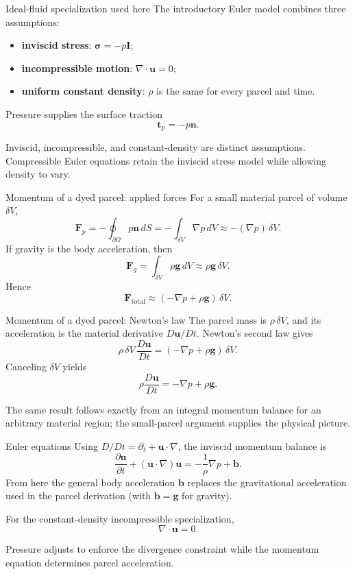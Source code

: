 \documentclass[aspectratio=169,11pt]{beamer}
\newcommand{\uvec}{\bm{u}}
\newcommand{\nvec}{\bm{n}}
\newcommand{\bvec}{\bm{b}}
\newcommand{\tvec}{\bm{t}}
\newcommand{\stress}{\bm{\sigma}}
\newcommand{\Identity}{\mathbf{I}}
\begin{document}
\begin{frame}{Ideal-fluid specialization used here}
The introductory Euler model combines three assumptions:
\begin{itemize}\itemsep7pt
  \item \textbf{inviscid stress}: $\stress=-p\Identity$;
  \item \textbf{incompressible motion}: $\nabla\cdot\uvec=0$;
  \item \textbf{uniform constant density}: $\rho$ is the same for every parcel and time.
\end{itemize}
Pressure supplies the surface traction
\[
  \tvec_p=-p\nvec.
\]
\begin{punchbox}
\small Inviscid, incompressible, and constant-density are distinct assumptions. Compressible Euler equations retain the inviscid stress model while allowing density to vary.
\end{punchbox}
\end{frame}

\begin{frame}{Momentum of a dyed parcel: applied forces}
For a small material parcel of volume $\delta V$,
\[
  \mathbf{F}_p
  =-\oint_{\partial\Omega}p\nvec\,dS
  =-\int_{\delta V}\nabla p\,dV
  \approx-(\nabla p)\,\delta V.
\]
If gravity is the body acceleration, then
\[
  \mathbf{F}_g
  =\int_{\delta V}\rho\bm g\,dV
  \approx\rho\bm g\,\delta V.
\]
Hence
\[
  \boxed{\mathbf{F}_{\mathrm{total}}
  \approx(-\nabla p+\rho\bm g)\,\delta V}.
\]
\end{frame}

\begin{frame}{Momentum of a dyed parcel: Newton's law}
The parcel mass is $\rho\,\delta V$, and its acceleration is the material derivative $D\uvec/Dt$. Newton's second law gives
\[
  \rho\,\delta V\,\frac{D\uvec}{Dt}
  =(-\nabla p+\rho\bm g)\,\delta V.
\]
Canceling $\delta V$ yields
\[
  \boxed{
  \rho\frac{D\uvec}{Dt}=-\nabla p+\rho\bm g}.
\]
\begin{punchbox}
\small The same result follows exactly from an integral momentum balance for an arbitrary material region; the small-parcel argument supplies the physical picture.
\end{punchbox}
\end{frame}

\begin{frame}{Euler equations}
Using $D/Dt=\partial_t+\uvec\cdot\nabla$, the inviscid momentum balance is
\[
  \boxed{
  \frac{\partial\uvec}{\partial t}
  +(\uvec\cdot\nabla)\uvec
  =-\frac{1}{\rho}\nabla p+\bvec}.
\]
From here the general body acceleration $\bvec$ replaces the gravitational acceleration used in the parcel derivation (with $\bvec=\bm g$ for gravity).

For the constant-density incompressible specialization,
\[
  \boxed{\nabla\cdot\uvec=0}.
\]
\begin{punchbox}
\small Pressure adjusts to enforce the divergence constraint while the momentum equation determines parcel acceleration.
\end{punchbox}
\end{frame}
\end{document}
